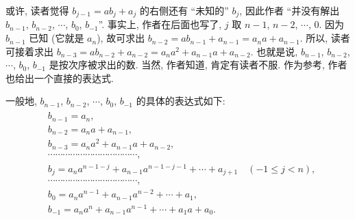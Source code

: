 \begin{remark}
    或许, 读者觉得 $b_{j-1} = ab_j + a_j$ 的右侧还有 ``未知的'' $b_j$, 因此作者 ``并没有解出 $b_{n-1}$, $b_{n-2}$, $\cdots$, $b_0$, $b_{-1}$''. 事实上, 作者在后面也写了, $j$ 取 $n-1$, $n-2$, $\cdots$, $0$. 因为 $b_{n-1}$ 已知 (它就是 $a_n$), 故可求出 $b_{n-2} = ab_{n-1} + a_{n-1} = a_n a + a_{n-1}$. 所以, 读者可接着求出 $b_{n-3} = ab_{n-2} + a_{n-2} = a_n a^2 + a_{n-1} a + a_{n-2}$. 也就是说, $b_{n-1}$, $b_{n-2}$, $\cdots$, $b_0$, $b_{-1}$ 是按次序被求出的数. 当然, 作者知道, 肯定有读者不服. 作为参考, 作者也给出一个直接的表达式.

    一般地, $b_{n-1}$, $b_{n-2}$, $\cdots$, $b_0$, $b_{-1}$ 的具体的表达式如下:
    \begin{align*}
        \tag*{(E)} \begin{aligned}
             & b_{n-1} = a_n,                                                                        \\
             & b_{n-2} = a_n a + a_{n-1},                                                            \\
             & b_{n-3} = a_n a^2 + a_{n-1} a + a_{n-2},                                              \\
             & \cdots \cdots \cdots \cdots \cdots \cdots \cdots \cdots \cdots \cdots \cdots \cdots,  \\
             & b_{j} = a_n a^{n-1-j} + a_{n-1} a^{n-1-j-1} + \cdots + a_{j+1} \quad (-1 \leq j < n), \\
             & \cdots \cdots \cdots \cdots \cdots \cdots \cdots \cdots \cdots \cdots \cdots \cdots,  \\
             & b_{0} = a_n a^{n-1} + a_{n-1} a^{n-2} + \cdots + a_1,                                 \\
             & b_{-1} = a_n a^n + a_{n-1} a^{n-1} + \cdots + a_1 a + a_0.
        \end{aligned}
    \end{align*}
\end{remark}

